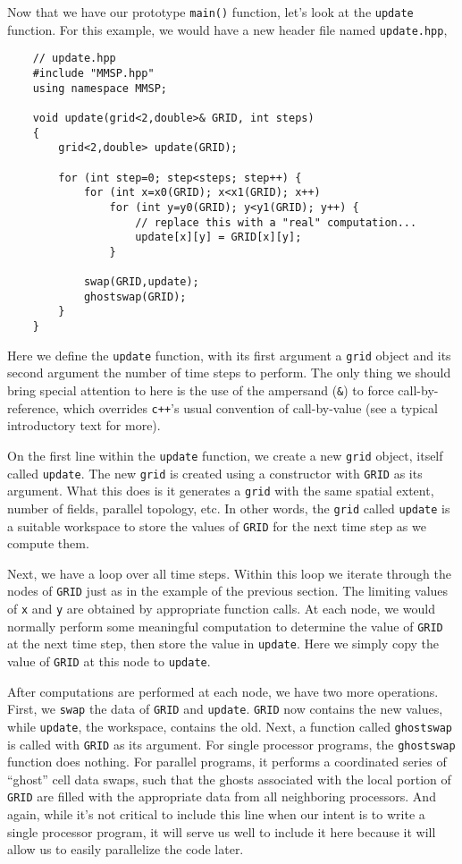 Now that we have our prototype {\tt main()} function, let's look at the {\tt update} function.  For this example, we would have a new header file named {\tt update.hpp},
\begin{shadebox}
\begin{verbatim}
    // update.hpp
    #include "MMSP.hpp"
    using namespace MMSP;

    void update(grid<2,double>& GRID, int steps)
    {
        grid<2,double> update(GRID);

        for (int step=0; step<steps; step++) {
            for (int x=x0(GRID); x<x1(GRID); x++)
                for (int y=y0(GRID); y<y1(GRID); y++) {
                    // replace this with a "real" computation...
                    update[x][y] = GRID[x][y];
                }

            swap(GRID,update);
            ghostswap(GRID);
        }
    }
\end{verbatim}
\end{shadebox}
Here we define the {\tt update} function, with its first argument a {\tt grid} object and its second argument the number of time steps to perform.  The only thing we should bring special attention to here is the use of the ampersand ({\tt \&}) to force call-by-reference, which overrides {\tt c++}'s usual convention of call-by-value (see a typical introductory text for more).

On the first line within the {\tt update} function, we create a new {\tt grid} object, itself called {\tt update}.  The new {\tt grid} is created using a constructor with {\tt GRID} as its argument.  What this does is it generates a {\tt grid} with the same spatial extent, number of fields, parallel topology, etc.  In other words, the {\tt grid} called {\tt update} is a suitable workspace to store the values of {\tt GRID} for the next time step as we compute them.

Next, we have a loop over all time steps.  Within this loop we iterate through the nodes of {\tt GRID} just as in the example of the previous section.  The limiting values of {\tt x} and {\tt y} are obtained by appropriate function calls.  At each node, we would normally perform some meaningful computation to determine the value of {\tt GRID} at the next time step, then store the value in {\tt update}.  Here we simply copy the value of {\tt GRID} at this node to {\tt update}.

After computations are performed at each node, we have two more operations.  First, we {\tt swap} the data of {\tt GRID} and {\tt update}.  {\tt GRID} now contains the new values, while {\tt update}, the workspace, contains the old.  Next, a function called {\tt ghostswap} is called with {\tt GRID} as its argument.  For single processor programs, the {\tt ghostswap} function does nothing.  For parallel programs, it performs a coordinated series of ``ghost'' cell data swaps, such that the ghosts associated with the local portion of {\tt GRID} are filled with the appropriate data from all neighboring processors.  And again, while it's not critical to include this line when our intent is to write a single processor program, it will serve us well to include it here because it will allow us to easily parallelize the code later.


